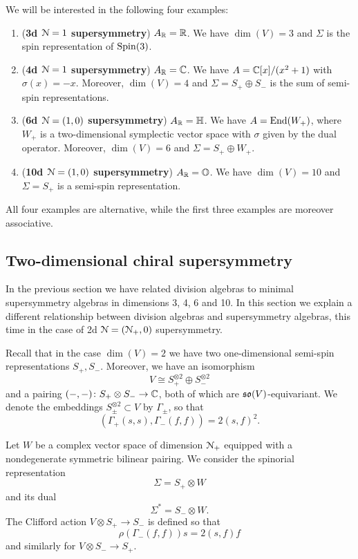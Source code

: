 \documentclass[10pt, oneside]{article}
\begin{document}
We will be interested in the following four examples:
\begin{enumerate}
\item (\textbf{3d $\mathcal{N}=1$ supersymmetry}) $A_\mathbb R = \mathbb R$. We have $\dim(V) = 3$ and $\Sigma$ is the spin representation of $\mathrm{Spin}(3)$.

\item (\textbf{4d $\mathcal{N}=1$ supersymmetry}) $A_\mathbb R = \mathbb C$. We have $A = \mathbb C[x]/(x^2+1)$ with $\sigma(x) = -x$. Moreover, $\dim(V) = 4$ and $\Sigma=S_+\oplus S_-$ is the sum of semi-spin representations.

\item (\textbf{6d $\mathcal{N}=(1, 0)$ supersymmetry}) $A_\mathbb R = \mathbb{H}$. We have $A=\operatorname{End}(W_+)$, where $W_+$ is a two-dimensional symplectic vector space with $\sigma$ given by the dual operator. Moreover, $\dim(V) = 6$ and $\Sigma = S_+\oplus W_+$.

\item (\textbf{10d $\mathcal{N}=(1, 0)$ supersymmetry}) $A_\mathbb R = \mathbb{O}$. We have $\dim(V) = 10$ and $\Sigma = S_+$ is a semi-spin representation.
\end{enumerate}

All four examples are alternative, while the first three examples are moreover associative.

\subsection{Two-dimensional chiral supersymmetry}

In the previous section we have related division algebras to minimal supersymmetry algebras in dimensions 3, 4, 6 and 10. In this section we explain a different relationship between division algebras and supersymmetry algebras, this time in the case of 2d $\mathcal N=(\mathcal N_+, 0)$ supersymmetry.

Recall that in the case $\dim(V) = 2$ we have two one-dimensional semi-spin representations $S_+, S_-$. Moreover, we have an isomorphism
\[V\cong S_+^{\otimes 2}\oplus S_-^{\otimes 2}\]
and a pairing $( -, -)\colon S_+\otimes S_-\rightarrow \mathbb C$, both of which are $\mathfrak{so}(V)$-equivariant. We denote the embeddings $S_{\pm}^{\otimes 2}\subset V$ by $\Gamma_{\pm}$, so that
\begin{equation}
(\Gamma_+(s, s), \Gamma_-(f, f)) = 2(s, f)^2.
\label{eq:2dvectorpairing}
\end{equation}

Let $W$ be a complex vector space of dimension $\mathcal N_+$ equipped with a nondegenerate symmetric bilinear pairing. We consider the spinorial representation
\[\Sigma = S_+\otimes W\]
and its dual
\[\Sigma^* = S_-\otimes W.\]
The Clifford action $V\otimes S_+\rightarrow S_-$ is defined so that
\[\rho(\Gamma_-(f, f)) s = 2(s, f) f\]
and similarly for $V\otimes S_-\rightarrow S_+$.
\end{document}
